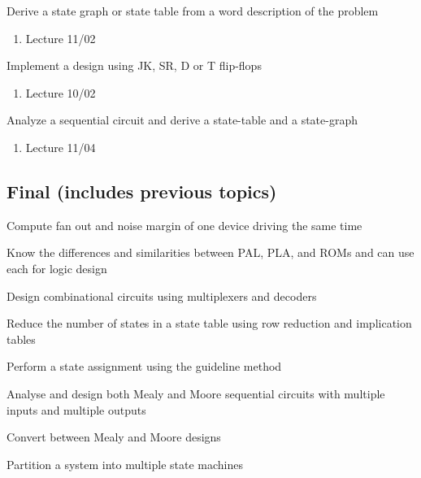 \documentclass[options]{article}
\newcommand{\cmark}{\ding{51}}%
\newcommand{\done}{\rlap{$\square$}{\raisebox{2pt}{\large\hspace{1pt}\cmark}}%
  \hspace{-2.5pt}}
\begin{document}
\begin{todolist}
\item Derive a state graph or state table from a word description of the problem
  \begin{enumerate}
  \item Lecture 11/02
  \end{enumerate}
\item Implement a design using JK, SR, D or T flip-flops
  \begin{enumerate}
  \item Lecture 10/02
  \end{enumerate}
\item Analyze a sequential circuit and derive a state-table and a state-graph
  \begin{enumerate}
  \item Lecture 11/04
  \end{enumerate}
\end{todolist}
\subsection{Final (includes previous topics)}
\begin{todolist}
  \item Compute fan out and noise margin of one device driving the same time
  \item Know the differences and similarities between PAL, PLA, and ROMs and can use each for logic design
  \item Design combinational circuits using multiplexers and decoders
  \item Reduce the number of states in a state table using row reduction and implication tables
  \item Perform a state assignment using the guideline method
  \item Analyse and design both Mealy and Moore sequential circuits with multiple inputs and multiple outputs
  \item Convert between Mealy and Moore designs
  \item Partition a system into multiple state machines
\end{todolist}

\end{document}
